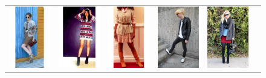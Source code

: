 \begin{figure}[H]
	\centering
	\setlength{\tabcolsep}{0.1pt}
	\setlength{\fboxsep}{0pt}%
	\setlength{\fboxrule}{0.1pt}%
	\renewcommand{\arraystretch}{0.6}
	\begin{tabular}{cccccc}
		\includegraphics[width=.15\textwidth]{figures/processedimages/original/0371919.jpg} & 
		\includegraphics[width=.15\textwidth]{figures/processedimages/original/0811966.jpg} &
		\includegraphics[width=.15\textwidth]{figures/processedimages/original/0895548.jpg} &
		\includegraphics[width=.15\textwidth]{figures/processedimages/original/1069129.jpg} &
		\includegraphics[width=.15\textwidth]{figures/processedimages/original/1088975.jpg} &

\end{tabular}
\end{figure}
